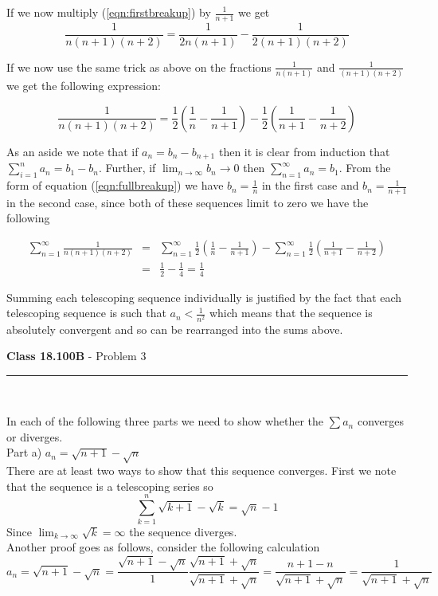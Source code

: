 \documentclass[11pt,reqno]{article}
\begin{document}
If we now multiply (\ref{eqn:firstbreakup}) by $\frac{1}{n+1}$ we get 
\[ \frac{1}{n(n+1)(n+2)} = \frac{1}{2n(n+1)} - \frac{1}{2(n+1)(n+2)} \]

If we now use the same trick as above on the fractions $\frac{1}{n(n+1)}$ and $\frac{1}{(n+1)(n+2)}$ we get the following expression:

\begin{equation}
 \frac{1}{n(n+1)(n+2)} = \frac{1}{2}(\frac{1}{n} - \frac{1}{n+1}) - \frac{1}{2}(\frac{1}{n+1} - \frac{1}{n+2}) \label{eqn:fullbreakup}
\end{equation}

As an aside we note that if $a_n = b_n - b_{n+1}$ then it is clear from induction that $\sum_{i = 1}^n a_n = b_1 - b_n$. Further, if $\lim_{n \to \infty}b_n \to 0$ then $\sum_{n = 1}^\infty a_n = b_1$. From the form of equation (\ref{eqn:fullbreakup}) we have $b_n = \frac{1}{n}$ in the first case and $b_n = \frac{1}{n+1}$ in the second case, since both of these sequences limit to zero we have the following 

\begin{eqnarray*}
\sum_{n =1}^\infty \frac{1}{n(n+1)(n+2)} &=& \sum_{n =1}^\infty \frac{1}{2}(\frac{1}{n} - \frac{1}{n+1}) - \sum_{n =1}^\infty \frac{1}{2}(\frac{1}{n+1} - \frac{1}{n+2}) \\
                  & = & \frac{1}{2} - \frac{1}{4} = \frac{1}{4}
\end{eqnarray*}

Summing each telescoping sequence individually is justified by the fact that each telescoping sequence is such that $a_n < \frac{1}{n^2}$ which means that the sequence is absolutely convergent and so can be rearranged into the sums above.

\vspace{15pt}
\begin{flushleft} 
\textbf{Class 18.100B} - Problem 3\\
\rule{500pt}{1pt}\\
\end{flushleft} 

In each of the following three parts we need to show whether the $\sum a_n$ converges or diverges.\\

\noindent Part a) $a_n = \sqrt{n+1} - \sqrt{n}$\\
\indent There are at least two ways to show that this sequence converges. First we note that the sequence is a telescoping series so
\[ \sum_{k=1}^n \sqrt{k+1} - \sqrt{k} =  \sqrt{n} - 1\]
Since $\lim_{k \to \infty} \sqrt{k} = \infty$ the sequence diverges. \\
\indent Another proof goes as follows, consider the following calculation
\begin{equation}
a_n = \sqrt{n+1}-\sqrt{n} = \frac{\sqrt{n+1}-\sqrt{n}}{1} \frac{\sqrt{n+1} + \sqrt{n}}{\sqrt{n+1} + \sqrt{n}} = \frac{n+1 - n}{\sqrt{n+1} + \sqrt{n}} = \frac{1}{\sqrt{n+1} + \sqrt{n}} \nonumber
\end{equation}
\end{document}
